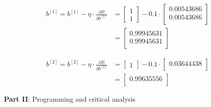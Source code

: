 \documentclass[12pt]{article}
\begin{document}
\begin{enumerate}[leftmargin=\labelsep]
        \begin{equation*}
          \begin{aligned}
            b^{[1]} = b^{[1]} - \eta \cdot \frac{\partial E}{\partial b^{[1]}}
             & = \begin{bmatrix}
                   1 \\
                   1
                 \end{bmatrix} - 0.1 \cdot \begin{bmatrix}
                                             0.00543686 \\
                                             0.00543686 \\
                                           \end{bmatrix} \\
             & = \begin{bmatrix}
                   0.99945631 \\
                   0.99945631 \\
                 \end{bmatrix}
          \end{aligned}
        \end{equation*}

        \begin{equation*}
          \begin{aligned}
            b^{[2]} = b^{[2]} - \eta \cdot \frac{\partial E}{\partial b^{[2]}}
             & = \begin{bmatrix}
                   1
                 \end{bmatrix} - 0.1 \cdot \begin{bmatrix}
                                             0.03644438 \\
                                           \end{bmatrix} \\
             & = \begin{bmatrix}
                   0.99635556 \\
                 \end{bmatrix}
          \end{aligned}
        \end{equation*}


\end{enumerate}

\pagebreak

\center\large{\textbf{Part II}: Programming and critical analysis}
\end{document}
